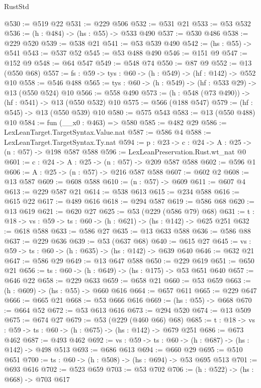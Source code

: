 \begin{lexlean}{RustStd}
\begin{coremodule}
@530 := @519 @22
@531 := @229 @506
@532 := @531 @21
@533 := @53 @532
@536 := (h : @484) -> (hs : @55) -> @533 @490
@537 := @530 @486
@538 := @229 @520
@539 := @538 @21
@541 := @53 @539 @490
@542 := (hs : @55) -> @541
@543 := @537 @52
@545 := @53 @488 @490
@546 := @151 @9
@547 := @152 @9
@548 := @64 @547
@549 := @548 @74
@550 := @87 @9
@552 := @13 (@550 @68)
@557 := {fs : @59} -> {tys : @60} -> (h : @549) -> (hf : @142) -> @552 @10
@558 := @546 @488
@565 := {tys : @60} -> (h : @549) -> (hf : @533 @29) -> @13 (@550 @524) @10
@566 := @558 @490
@573 := (h : @548 (@73 @490)) -> (hf : @541) -> @13 (@550 @532) @10
@575 := @566 (@188 @547)
@579 := (hf : @545) -> @13 (@550 @539) @10
@580 := @575 @543
@583 := @13 (@550 @488) @10
@584 := fun (__x0 : @463) => @580
@585 := @482 @29
@586 := LexLeanTarget.TargetSyntax.Value.nat
@587 := @586 @4
@588 := LexLeanTarget.TargetSyntax.Ty.nat
@594 := {p : @23} -> {c : @24} -> {A : @25} -> (n : @57) -> @198 @587 @588
@596 := LexLeanPreservation.Rust.wt_nat @0
@601 := {c : @24} -> {A : @25} -> (n : @57) -> @209 @587 @588
@602 := @596 @1
@606 := {A : @25} -> (n : @57) -> @216 @587 @588
@607 := @602 @2
@608 := @13 @587
@609 := @608 @588
@610 := (n : @57) -> @609
@611 := @607 @4
@613 := @229 @587 @21
@614 := @538 @613
@615 := @234 @588
@616 := @615 @22
@617 := @489 @616
@618 := @294 @587
@619 := @586 @68
@620 := @13 @619
@621 := @620 @27
@625 := @53 (@229 (@586 @79) @68)
@631 := {t : @18} -> {vs : @59} -> {ts : @60} -> (h : @621) -> (hs : @142) -> @625 @251
@632 := @618 @588
@633 := @586 @27
@635 := @13 @633 @588
@636 := @586 @88
@637 := @229 @636
@639 := @53 (@637 @68)
@640 := @615 @27
@645 := {vs : @59} -> {ts : @60} -> (h : @635) -> (hs : @142) -> @639 @640
@646 := @632 @21
@647 := @586 @29
@649 := @13 @647 @588
@650 := @229 @619
@651 := @650 @21
@656 := {ts : @60} -> (h : @649) -> (hs : @175) -> @53 @651 @640
@657 := @646 @22
@658 := @229 @633
@659 := @658 @21
@660 := @53 @659
@663 := (h : @609) -> (hs : @55) -> @660 @616
@664 := @657 @611
@665 := @229 @647
@666 := @665 @21
@668 := @53 @666 @616
@669 := (hs : @55) -> @668
@670 := @664 @52
@672 := @53 @613 @616
@673 := @294 @520
@674 := @13 @509
@675 := @674 @27
@679 := @53 (@229 (@460 @66) @68)
@685 := {t : @18} -> {vs : @59} -> {ts : @60} -> (h : @675) -> (hs : @142) -> @679 @251
@686 := @673 @462
@687 := @493 @462
@692 := {vs : @59} -> {ts : @60} -> (h : @687) -> (hs : @142) -> @498 @513
@693 := @686 @613
@694 := @660 @29
@695 := @510 @651
@700 := {ts : @60} -> (h : @508) -> (hs : @694) -> @53 @695 @513
@701 := @693 @616
@702 := @523 @659
@703 := @53 @702
@706 := (h : @522) -> (hs : @668) -> @703 @617

\end{coremodule}
\end{lexlean}
